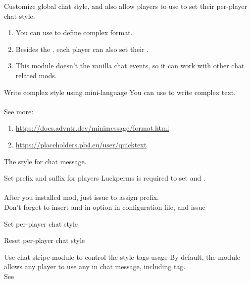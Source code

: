 Customize global chat style, and also allow players to use  to set their per-player chat style.

\begin{enumerate}
    \item You can use  to define complex format.
    \item Besides the , each player can also set their .
    \item This module doesn't  the vanilla chat events, so it can work with other chat related mods.
\end{enumerate}

\begin{tips}{Write complex style using mini-language}
    You can use  to write complex text.\\
    \\
    See more:
    \begin{enumerate}
        \item \url{https://docs.advntr.dev/minimessage/format.html}
        \item \url{https://placeholders.pb4.eu/user/quicktext}
    \end{enumerate}
\end{tips}

\begin{Configuration}

    \item[style]{
        The style for chat message.
    }

\end{Configuration}

\begin{example}{Set prefix and suffix for players}
    Luckperms is required to set  and . \\
    \\
    After you installed  mod, just issue  to assign prefix. \\
    Don't forget to insert  and  in  option in configuration file, and issue 
\end{example}

\begin{example}{Set per-player chat style}
\end{example}

\begin{example}{Reset per-player chat style}
\end{example}

\begin{example}{Use chat stripe module to control the style tags usage}
    By default, the  module allows any player to use any  in chat message, including  tag.\\
    See~
\end{example}
